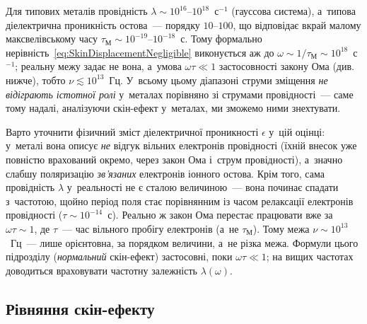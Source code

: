 Для типових металів провідність $\lambda \sim 10^{16}$--$10^{18}$~с$^{-1}$ (гауссова
система), а~типова діелектрична проникність остова~--- порядку $10$--$100$, що відповідає
вкрай малому максвелівському часу $\tau_\text{М} \sim 10^{-19}$--$10^{-18}$~с. Тому формально нерівність~\eqref{eq:SkinDisplacementNegligible} виконується аж до $\omega\sim1/\tau_\text{М}\sim10^{18}$~с$^{-1}$; реальну межу задає не вона, а~умова $\omega\tau\ll1$ застосовності закону Ома (див. нижче), тобто $\nu\lesssim10^{13}$~Гц. У~всьому цьому діапазоні струми зміщення \emph{не відіграють істотної ролі} у~металах порівняно зі струмами провідності~--- саме тому надалі, аналізуючи скін-ефект у~металах, ми зможемо ними знехтувати.

Варто уточнити фізичний зміст діелектричної проникності $\epsilon$ у~цій оцінці:
у~металі вона описує \emph{не} відгук вільних електронів провідності (їхній внесок
уже повністю врахований окремо, через закон Ома і~струм провідності), а~значно слабшу
поляризацію \emph{зв'язаних} електронів іонного остова. Крім того, сама провідність
$\lambda$ у~реальності не є сталою величиною~--- вона починає спадати з~частотою,
щойно період поля стає порівнянним із часом релаксації електронів провідності ($\tau
\sim 10^{-14}$~с). Реально ж закон Ома перестає працювати вже за $\omega\tau\sim1$, де $\tau$~--- час вільного пробігу електронів (а~не $\tau_\text{М}$). Тому межа $\nu\sim10^{13}$~Гц~--- лише орієнтовна, за порядком величини, а~не різка межа. Формули цього підрозділу (\emph{нормальний} скін-ефект)
застосовні, поки $\omega\tau\ll1$; на вищих частотах доводиться враховувати частотну
залежність $\lambda(\omega)$.


\subsection*{Рівняння скін-ефекту}


